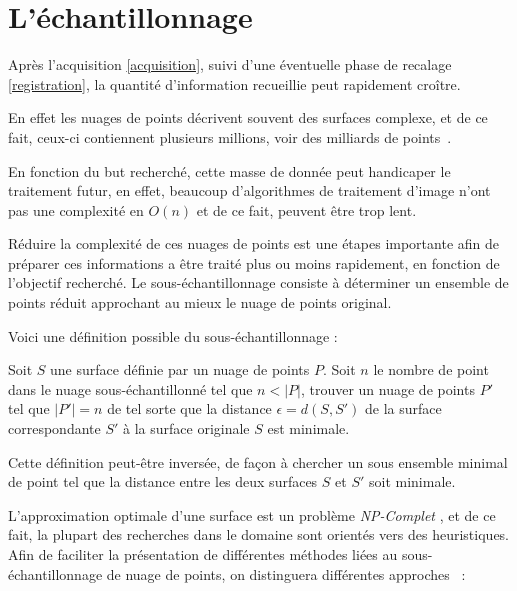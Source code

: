 \section{L'échantillonnage}

Après l'acquisition \ref{acquisition}, suivi d'une éventuelle phase de recalage \ref{registration}, la quantité d'information recueillie peut rapidement croître.

En effet les nuages de points  décrivent souvent des surfaces complexe, et de ce fait, ceux-ci contiennent plusieurs millions, voir des milliards de points~\cite{Levoy}.

En fonction du but recherché, cette masse de donnée peut handicaper le traitement futur, en effet, beaucoup d'algorithmes de traitement d'image n'ont pas une complexité en $O(n)$ et de ce fait, peuvent être trop lent.

Réduire la complexité de ces nuages de points  est une étapes importante afin de préparer ces informations a être traité plus ou moins rapidement, en fonction de l'objectif recherché. Le sous-échantillonnage consiste à déterminer un ensemble de points réduit approchant au mieux le nuage de points  original.

Voici une définition possible du sous-échantillonnage  \cite{Pauly2003}:

\begin{definition}
  Soit $S$ une surface définie par un nuage de points $P$.
  Soit $n$ le nombre de point dans le nuage sous-échantillonné tel que $n<|P|$, trouver un nuage de points $P'$ tel que $|P'|=n$ de tel sorte que la distance $\epsilon = d(S,S')$ de la surface correspondante $S'$ à la surface originale $S$ est minimale.
\end{definition}

Cette définition peut-être inversée, de façon à chercher un sous ensemble minimal de point tel que la distance entre les deux surfaces $S$ et $S'$ soit minimale.

L'approximation optimale d'une surface est un problème \emph{NP-Complet} \cite{Agarwal1994}, et de ce fait, la plupart des recherches dans le domaine sont orientés vers des heuristiques.\\

Afin de faciliter la présentation de différentes méthodes liées au sous-échantillonnage de nuage de points, on distinguera différentes approches ~\cite{Pauly2002}:

